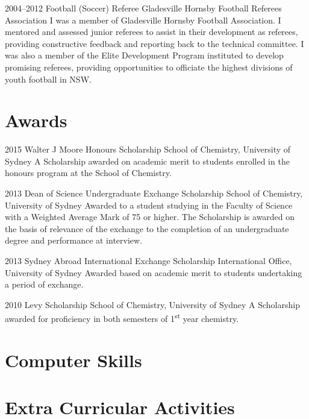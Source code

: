 \cventry
{2004--2012}
{Football (Soccer) Referee}
{Gladesville Hornsby Football Referees Association}
{}{}
{I was a member of Gladesville Hornsby Football Association. I mentored and assessed junior referees to assist in their development as referees, providing constructive feedback and reporting back to the technical committee. I was also a member of the Elite Development Program instituted to develop promising referees, providing opportunities to officiate the highest divisions of youth football in NSW.}

\section{Awards}

\cventry
{2015}
{Walter J Moore Honours Scholarship}
{School of Chemistry, University of Sydney}
{}{}
{A Scholarship awarded on academic merit to students enrolled in the honours program at the School of Chemistry.}

\cventry
{2013}
{Dean of Science Undergraduate Exchange Scholarship}
{School of Chemistry, University of Sydney}
{}{}
{Awarded to a student studying in the Faculty of Science with a Weighted Average Mark of 75 or higher. The Scholarship is awarded on the basis of relevance of the exchange to the completion of an undergraduate degree and performance at interview.}

\cventry
{2013}
{Sydney Abroad International Exchange Scholarship}
{International Office, University of Sydney}
{}{}
{Awarded based on academic merit to students undertaking a period of exchange.}

\cventry
{2010}
{Levy Scholarship}
{School of Chemistry, University of Sydney}
{}{}
{A Scholarship awarded for proficiency in both semesters of 1\textsuperscript{st} year chemistry.}

\section{Computer Skills}

\section{Extra Curricular Activities}

